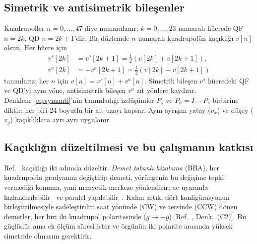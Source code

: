 \documentclass[12pt,a4paper]{extarticle}
\begin{document}
\subsection{Simetrik ve antisimetrik bileşenler}
Kuadrupoller $n=0,\dots,47$ diye numaralanır; $k=0,\dots,23$ numaralı hücrede QF $n=2k$, QD $n=2k+1$'dir.
Bir düzlemde $n$ numaralı kuadrupolün kaçıklığı $v[n]$ olsun. Her hücre için
\begin{equation}
\begin{split}
v^s[2k]&=v^s[2k+1]=\tfrac12\left(v[2k]+v[2k+1]\right),\\
v^a[2k]&=-v^a[2k+1]=\tfrac12\left(v[2k]-v[2k+1]\right)
\end{split}
\label{eq:symanti}
\end{equation}
tanımlarız; her $n$ için $v[n]=v^s[n]+v^a[n]$. Simetrik bileşen $v^s$ hücredeki QF ve QD'yi aynı yöne,
antisimetrik bileşen $v^a$ zıt yönlere kaydırır. Denklem~\eqref{eq:symanti}'nin tanımladığı izdüşümler
$P_s$ ve $P_a=I-P_s$ birbirine diktir; her biri 24 boyutlu bir alt uzayı kapsar. Aynı ayrışım yatay ($v_x$)
ve düşey ($v_y$) kaçıklıklara ayrı ayrı uygulanır.

\subsection{Kaçıklığın düzeltilmesi ve bu çalışmanın katkısı}
Ref.~\cite{omarov} kaçıklığı iki adımda düzeltir. \emph{Demet tabanlı hizalama} (BBA), her kuadrupolün
gradyanını değiştirip demeti, yörüngenin bu değişime tepki vermediği konuma, yani manyetik merkeze yönlendirir;
ac uyarımla hızlandırılabilir~\cite{marti} ve paralel yapılabilir~\cite{huang}. Kalan artık, dört
konfigürasyonun birleştirilmesiyle sadeleştirilir: saat yönünde (CW) ve tersinde (CCW) dönen demetler, her
biri iki kuadrupol polaritesinde ($g\to-g$) [Ref.~\cite{omarov}, Denk.~(C2)]. Bu güçlüdür ama ek ölçüm
süresi ister ve örgünün iki polarite arasında yüksek simetride olmasını gerektirir.
\end{document}
